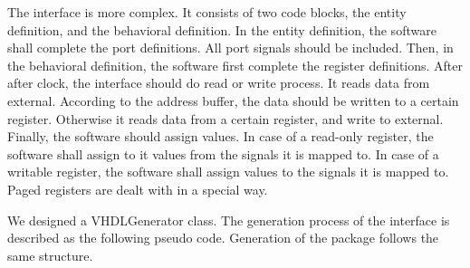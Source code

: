 The interface is more complex. It consists of two code blocks, the entity definition, and the behavioral definition. In the entity definition, the software shall complete the port definitions. All port signals should be included. Then, in the behavioral definition, the software first complete the register definitions. After after clock, the interface should do read or write process. It reads data from external. According to the address buffer, the data should be written to a certain register. Otherwise it reads data from a certain register, and write to external. Finally, the software should assign values. In case of a read-only register, the software shall assign to it values from the signals it is mapped to. In case of a writable register, the software shall assign values to the signals it is mapped to. Paged registers are dealt with in a special way.

We designed a VHDLGenerator class. The generation process of the interface is described as the following pseudo code. Generation of the package follows the same structure.

